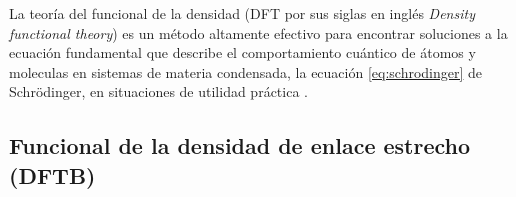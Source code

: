 La teoría del funcional de la densidad (DFT por sus siglas en inglés
\textit{Density functional theory}) es un método altamente efectivo para 
encontrar soluciones a la ecuación fundamental que describe el comportamiento 
cuántico de átomos y moleculas en sistemas de materia condensada, la ecuación 
\ref{eq:schrodinger} de Schrödinger, en situaciones de utilidad práctica 
\cite{sholl2022}.

\subsection{Funcional de la densidad de enlace estrecho (DFTB)}\label{s:dftb}


